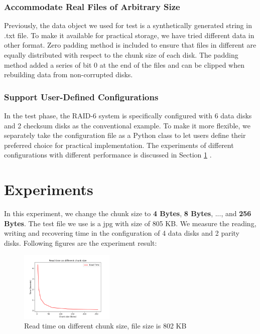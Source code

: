 \documentclass[journal]{IEEEtran}
\begin{document}
\subsubsection{Accommodate Real Files of Arbitrary Size} Previously, the data object we used for test is a synthetically generated string in .txt file. To make it available for practical storage, we have tried different data in other format. Zero padding method is included to ensure that files in different are equally distributed with respect to the chunk size of each disk. The padding  method added a series of bit 0 at the end of the files and can be clipped when rebuilding data from non-corrupted disks.

\subsubsection{Support User-Defined Configurations } In the test phase, the RAID-6 system is specifically configured with 6 data disks and 2 checksum disks as the conventional example.  To make it more flexible, we separately take the configuration file as a Python class to let users define their preferred choice for practical implementation. The experiments of different configurations with different performance is discussed in Section \ref{sec5} . 

\section{Experiments}
\label{sec5}
In this experiment, we change the chunk size to \textbf{4 Bytes}, \textbf{8 Bytes}, ..., and \textbf{256 Bytes}. The test file we use is a jpg with size of 805 KB. We measure the reading, writing and recovering time in the configuration of 4 data disks and 2 parity disks. Following figures are the experiment result:

\begin{figure}[htbp]
	\centering
	\captionsetup{justification=centering}
	\includegraphics[width=0.4\textwidth]{fig/result_read.png}
	\caption{Read time on different chunk size, file size is 802 KB}
\end{figure}
\end{document}
